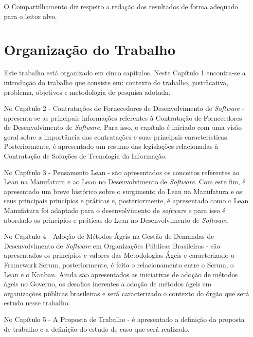 O Compartilhamento diz respeito a redação dos resultados de forma adequado para o leitor alvo.

\section[Organização do Trabalho]{Organização do Trabalho}

Este trabalho está organizado em cinco capítulos. Neste Capítulo 1 encontra-se a introdução do trabalho que consiste em: contexto do trabalho,  justificativa,  problema, objetivos e metodologia de pesquisa adotada.

No Capítulo 2 - Contratações de Fornecedores de Desenvolvimento de \textit{Software} - apresenta-se as principais informações referentes à Contratação de Fornecedores de Desenvolvimento de \textit{Software}. Para isso, o capítulo é iniciado com uma visão geral sobre a importância das contratações e suas principais características. Posteriormente, é apresentado um resumo das legislações relacionadas à Contratação de Soluções de Tecnologia da Informação.

No Capítulo 3 - Pensamento Lean - são apresentados os conceitos referentes ao Lean na Manufatura e ao Lean no Desenvolvimento de \textit{Software}. Com este fim, é apresentado um breve histórico sobre o surgimento do Lean na Manufatura e os seus principais princípios e práticas e, posteriormente, é apresentado como o Lean Manufatura foi adaptado para o desenvolvimento de \textit{software} e para isso é abordado os princípios e práticas do Lean no Desenvolvimento de \textit{Software}.

No Capítulo 4  - Adoção de Métodos Ágeis na Gestão de Demandas de Desenvolvimento de \textit{Software} em Organizações Públicas Brasileiras - são apresentados os princípios e valores das Metodologias Ágeis e caracterizado o Framework Scrum, posteriormente, é feito o relacionamento entre o Scrum, o Lean e o Kanban. Ainda são apresentados as iniciativas de adoção de métodos ágeis no Governo, os desafios inerentes a adoção de métodos ágeis em organizações públicas brasileiras e será caracterizado o contexto do órgão que será estudo nesse trabalho.

No Capítulo 5 - A Proposta de Trabalho - é apresentado a definição da proposta de trabalho e a definição do estudo de caso que será realizado.
